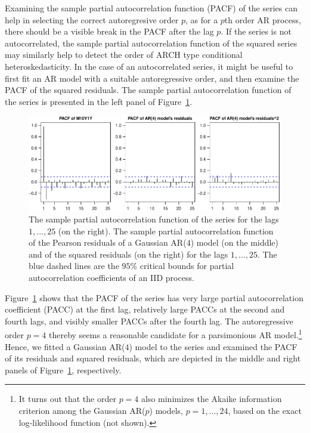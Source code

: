 \documentclass[nojss]{jss} %
\begin{document}
Examining the sample partial autocorrelation function (PACF) of the series can help in selecting the correct autoregresive order $p$, as for a $p$th order AR process, there should be a visible break in the PACF after the lag $p$. If the series is not autocorrelated, the sample partial autocorrelation function of the squared series may similarly help to detect the order of ARCH type conditional heteroskedasticity. In the case of an autocorrelated series, it might be useful to first fit an AR model with a suitable autoregressive order, and then examine the PACF of the squared residuals.
The sample partial autocorrelation function of the series  \citep[calculated using the function  from the package ,][]{R} is presented in the left panel of Figure~\ref{fig:pacf}.
%
\begin{figure}
  \centering
  \includegraphics{figures/pacfplot.pdf}
  \caption{The sample partial autocorrelation function of the series  for the lags $1,...,25$ (on the right). The sample partial autocorrelation function of the Pearson residuals of a Gaussian AR($4$) model (on the middle) and of the squared residuals (on the right) for the lags $1,...,25$. The blue dashed lines are the $95\%$ critical bounds for partial autocorrelation coefficients of an IID process.}
\label{fig:pacf}
\end{figure}
%

Figure~\ref{fig:pacf} shows that the PACF of the series has very large partial autocorrelation coefficient (PACC) at the first lag, relatively large PACCs at the second and fourth lags, and visibly smaller PACCs after the fourth lag. The autoregressive order $p=4$ thereby seems a reasonable candidate for a parsimonious AR model.\footnote{It turns out that the order $p=4$ also minimizes the Akaike information criterion among the Gaussian AR($p$) models, $p=1,...,24$, based on the exact log-likelihood function (not shown).} Hence, we fitted a Gaussian AR($4$) model to the series and examined the PACF of its residuals and squared residuals, which are depicted in the middle and right panels of Figure~\ref{fig:pacf}, respectively.
\end{document}
